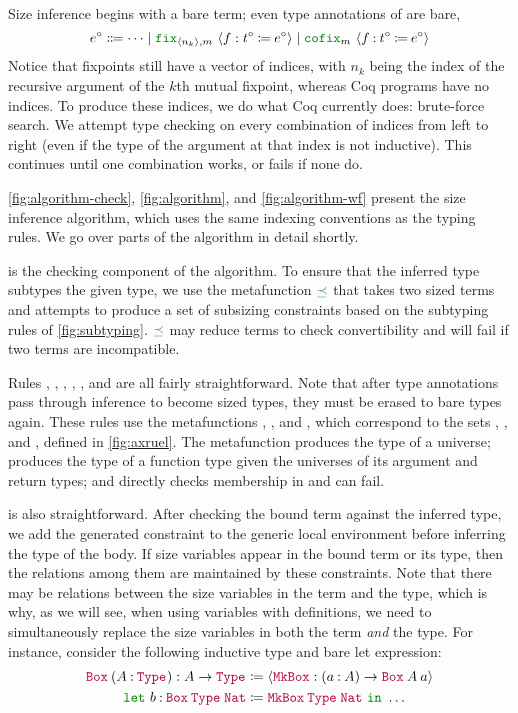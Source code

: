 


Size inference begins with a bare term; even type annotations of \cofixpoints are bare, \ie
  $$e^\circ \Coloneqq \dots
    \mid \fix{\seq{n_k}, m}{f}{t^\circ}{e^\circ}
    \mid \cofix{m}{f}{t^\circ}{e^\circ}$$
Notice that fixpoints still have a vector of indices, with $n_k$ being the index of the recursive argument of the $k$th mutual fixpoint, whereas Coq programs have no indices.
To produce these indices, we do what Coq currently does: brute-force search.
We attempt type checking on every combination of indices from left to right (even if the type of the argument at that index is not inductive).
This continues until one combination works, or fails if none do.

\autoref{fig:algorithm-check}, \autoref{fig:algorithm}, and \autoref{fig:algorithm-wf} present the size inference algorithm, which uses the same indexing conventions as the typing rules.
We go over parts of the algorithm in detail shortly.

 is the checking component of the algorithm.
To ensure that the inferred type subtypes the given type, we use the metafunction $\constrain$ that takes two sized terms and attempts to produce a set of subsizing constraints based on the subtyping rules of \autoref{fig:subtyping}.
$\constrain$ may reduce terms to check convertibility and will fail if two terms are incompatible.

Rules , , , , , and  are all fairly straightforward.
Note that after type annotations pass through inference to become sized types, they must be erased to bare types again.
These rules use the metafunctions \axiom, , and \elim, which correspond to the sets \Axioms, \Rules, and \Elims, defined in \autoref{fig:axruel}.
The metafunction \axiom produces the type of a universe;  produces the type of a function type given the universes of its argument and return types; and \elim directly checks membership in \Elims and can fail.

 is also straightforward.
After checking the bound term against the inferred type, we add the generated constraint to the generic local environment before inferring the type of the body.
If size variables appear in the bound term or its type, then the relations among them are maintained by these constraints.
Note that there may be relations between the size variables in the term and the type, which is why, as we will see, when using variables with definitions, we need to simultaneously replace the size variables in both the term \textit{and} the type.
For instance, consider the following inductive type and bare let expression:
\begin{align*}
  \app{\Box}{(\assm{A}{\Type{}})} : A \to \Type{} &\coloneqq
    \seq{\MkBox : (\assm{a}{A}) \to \app{\Box}{A}{a}} \\
  \letin{b}{\app{\Box}{\Type{}}{\Nat}&}{\app{\MkBox}{\Type{}}{\Nat}}{\dots}
\end{align*}

